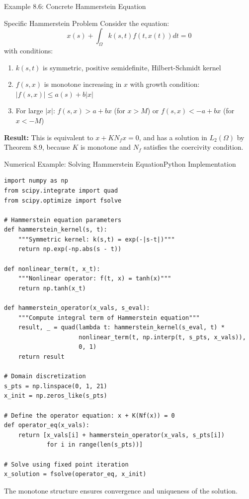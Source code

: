 \documentclass[aspectratio=169,10pt]{beamer}
\begin{document}
\begin{frame}{Example 8.6: Concrete Hammerstein Equation}
    \begin{exampleblock}{Specific Hammerstein Problem}
        Consider the equation:
        \[
            x(s) + \int_{\Omega} k(s,t) f(t, x(t)) dt = 0
        \]
        with conditions:
        \begin{enumerate}
            \item $k(s,t)$ is symmetric, positive semidefinite, Hilbert-Schmidt kernel
            \item $f(s,x)$ is monotone increasing in $x$ with growth condition: $|f(s,x)| \leq a(s) + b|x|$
            \item For large $|x|$: $f(s,x) > a + bx$ (for $x > M$) or $f(s,x) < -a + bx$ (for $x < -M$)
        \end{enumerate}
    \end{exampleblock}

    \vspace{0.2cm}

    \textbf{Result:} This is equivalent to $x + KN_f x = 0$, and has a solution in $L_2(\Omega)$
    by Theorem 8.9, because $K$ is monotone and $N_f$ satisfies the coercivity condition.
\end{frame}

\begin{frame}[fragile]{Numerical Example: Solving Hammerstein Equation}{Python Implementation}
    \begin{lstlisting}
import numpy as np
from scipy.integrate import quad
from scipy.optimize import fsolve

# Hammerstein equation parameters
def hammerstein_kernel(s, t):
    """Symmetric kernel: k(s,t) = exp(-|s-t|)"""
    return np.exp(-np.abs(s - t))

def nonlinear_term(t, x_t):
    """Nonlinear operator: f(t, x) = tanh(x)"""
    return np.tanh(x_t)

def hammerstein_operator(x_vals, s_eval):
    """Compute integral term of Hammerstein equation"""
    result, _ = quad(lambda t: hammerstein_kernel(s_eval, t) *
                     nonlinear_term(t, np.interp(t, s_pts, x_vals)),
                     0, 1)
    return result

# Domain discretization
s_pts = np.linspace(0, 1, 21)
x_init = np.zeros_like(s_pts)

# Define the operator equation: x + K(Nf(x)) = 0
def operator_eq(x_vals):
    return [x_vals[i] + hammerstein_operator(x_vals, s_pts[i])
            for i in range(len(s_pts))]

# Solve using fixed point iteration
x_solution = fsolve(operator_eq, x_init)
    \end{lstlisting}

    The monotone structure ensures convergence and uniqueness of the solution.
\end{frame}
\end{document}

